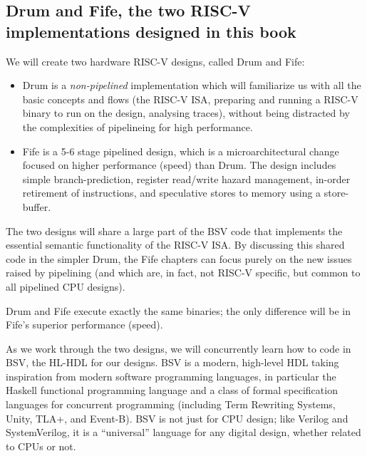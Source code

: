
\subsection{Drum and Fife, the two RISC-V implementations designed in this book}

We will create two hardware RISC-V designs, called Drum and Fife:

\begin{itemize}

  \item Drum is a \emph{non-pipelined} implementation which will
        familiarize us with all the basic concepts and flows (the
        RISC-V ISA, preparing and running a RISC-V binary to run on
        the design, analysing traces), without being distracted by the
        complexities of pipelineing for high performance.

  \item Fife is a 5-6 stage pipelined design, which is a
        microarchitectural change focused on higher performance
        (speed) than Drum. The design includes simple
        branch-prediction, register read/write hazard management,
        in-order retirement of instructions, and speculative stores to
        memory using a store-buffer.

\end{itemize}

The two designs will share a large part of the BSV code that
implements the essential semantic functionality of the RISC-V ISA.  By
discussing this shared code in the simpler Drum, the Fife chapters can
focus purely on the new issues raised by pipelining (and which are, in
fact, not RISC-V specific, but common to all pipelined CPU designs).

Drum and Fife execute exactly the same binaries; the only difference
will be in Fife's superior performance (speed).

As we work through the two designs, we will concurrently learn how to
code in BSV, the HL-HDL for our designs.  BSV is a modern, high-level
HDL taking inspiration from modern software programming languages, in
particular the Haskell functional programming language and a class of
formal specification languages for concurrent programming (including
Term Rewriting Systems, Unity, TLA+, and Event-B).  BSV is not just
for CPU design; like Verilog and SystemVerilog, it is a ``universal''
language for any digital design, whether related to CPUs or not.

